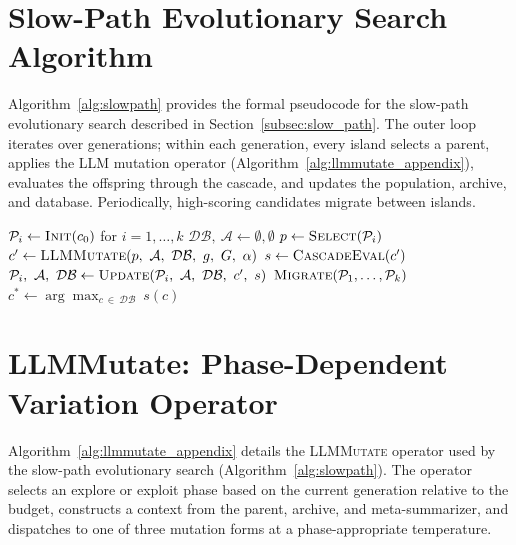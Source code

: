 \section{Slow-Path Evolutionary Search Algorithm}\label{sec:slowpath_algo}

Algorithm~\ref{alg:slowpath} provides the formal pseudocode for the slow-path evolutionary search described in Section~\ref{subsec:slow_path}. The outer loop iterates over generations; within each generation, every island selects a parent, applies the LLM mutation operator (Algorithm~\ref{alg:llmmutate_appendix}), evaluates the offspring through the cascade, and updates the population, archive, and database. Periodically, high-scoring candidates migrate between islands.

\begin{algorithm}[H]
\caption{\cufuse{} Slow-Path: LLM-Driven Evolutionary Search}
\label{alg:slowpath}
\begin{algorithmic}[1]
\setlength{\itemsep}{0pt}
\setlength{\parskip}{0pt}
\State $\mathcal{P}_i \gets \textsc{Init}(c_0)$ for $i = 1, \ldots, k$
\State $\mathcal{DB},\ \mathcal{A} \gets \emptyset, \emptyset$
        \State $p \gets \textsc{Select}(\mathcal{P}_i)$
        \State $c' \gets \textsc{LLMMutate}(p,\ \mathcal{A},\ \mathcal{DB},\ g,\ G,\ \alpha)$ 
        \State $s \gets \textsc{CascadeEval}(c')$ 
        \State $\mathcal{P}_i,\ \mathcal{A},\ \mathcal{DB} \gets \textsc{Update}(\mathcal{P}_i,\ \mathcal{A},\ \mathcal{DB},\ c',\ s)$
    \EndFor
    \State $\textsc{Migrate}(\mathcal{P}_1, \ldots, \mathcal{P}_k)$
\EndFor
\State \Return $c^* \gets \arg\max_{c\ \in\ \mathcal{DB}}\ s(c)$
\end{algorithmic}
\end{algorithm}

\section{LLMMutate: Phase-Dependent Variation Operator}\label{sec:llmmutate_details}

Algorithm~\ref{alg:llmmutate_appendix} details the \textsc{LLMMutate} operator used by the slow-path evolutionary search (Algorithm~\ref{alg:slowpath}). The operator selects an explore or exploit phase based on the current generation relative to the budget, constructs a context from the parent, archive, and meta-summarizer, and dispatches to one of three mutation forms at a phase-appropriate temperature.

